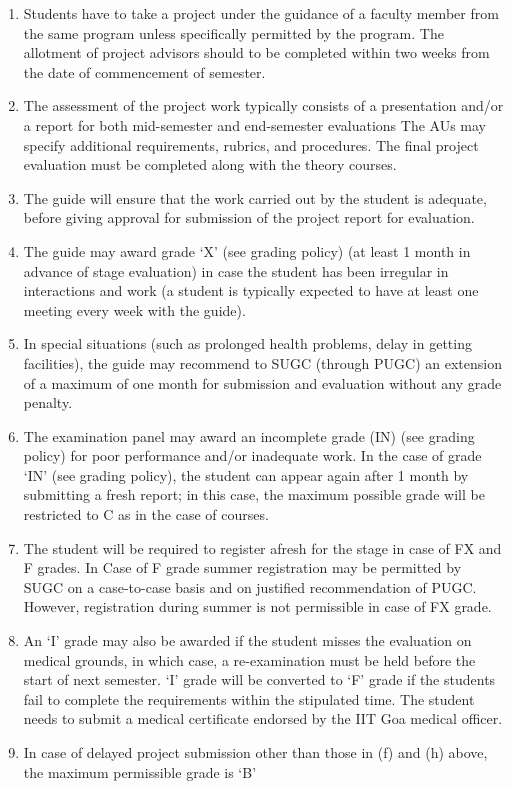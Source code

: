 \begin {enumerate}
    \item Students have to take a project under the guidance of a faculty member from the same program unless specifically permitted by the program. The allotment of project advisors should to be completed within two weeks from the date of commencement of semester.
    \item The assessment of the project work typically consists of a presentation and/or a report for both mid-semester and end-semester evaluations The AUs may specify additional requirements, rubrics, and procedures. The final project evaluation must be completed along with the theory courses. 
    \item The guide will ensure that the work carried out by the student is adequate, before giving approval for submission of the project report for evaluation. 
    \item The guide may award grade ‘X' (see grading policy) (at least 1 month in advance of stage evaluation) in case the student has been irregular in interactions and work (a student is typically expected to have at least one meeting every week with the guide). 
    \item In special situations (such as prolonged health problems, delay in getting facilities), the guide may recommend to SUGC (through PUGC) an extension of a maximum of one month for submission and evaluation without any grade penalty. 
    \item The examination panel may award an incomplete grade (IN) (see grading policy) for poor performance and/or inadequate work. In the case of grade ‘IN’ (see grading policy), the student can appear again after 1 month by submitting a fresh report; in this case, the maximum possible grade will be restricted to C as in the case of courses. 
    \item The student will be required to register afresh for the stage in case of FX and F grades. In Case of F grade summer registration may be permitted by SUGC on a case-to-case basis and on justified recommendation of PUGC. However, registration during summer is not permissible in case of FX grade. 
    \item An ‘I’ grade may also be awarded if the student misses the evaluation on medical grounds, in which case, a re-examination must be held before the start of next semester. ‘I’ grade will be converted to ‘F’ grade if the students fail to complete the requirements within the stipulated time. The student needs to submit a medical certificate endorsed by the IIT Goa medical officer.
    \item In case of delayed project submission other than those in (f) and (h) above, the maximum permissible grade is ‘B’ 
\end{enumerate}

